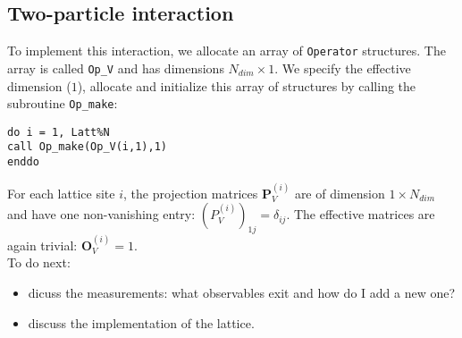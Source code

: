 \subsection{Two-particle interaction}
To implement this interaction, we allocate an array of \texttt{Operator} structures. The array is called  \texttt{Op\_V} and has dimensions $N_{dim}\times 1$. 
We specify the effective dimension ($1$), allocate and initialize this array of structures by calling the subroutine \texttt{Op\_make}: 
\begin{verbatim}
do i = 1, Latt%N
call Op_make(Op_V(i,1),1)
enddo
\end{verbatim}
For each lattice site $i$, the projection matrices ${\bm P}_{V}^{(i)}$ are of dimension $1\times N_{dim} $ and have one non-vanishing entry: $(P_{V}^{(i)})_{1j}=\delta_{ij}$. 
The effective matrices are again trivial: ${\bm O}_{V}^{(i)}=1$.\\



To do next:
\begin{itemize}
\item dicuss the measurements: what observables exit and how do I add a new one?
\item  discuss the implementation of the lattice.
\end{itemize}

